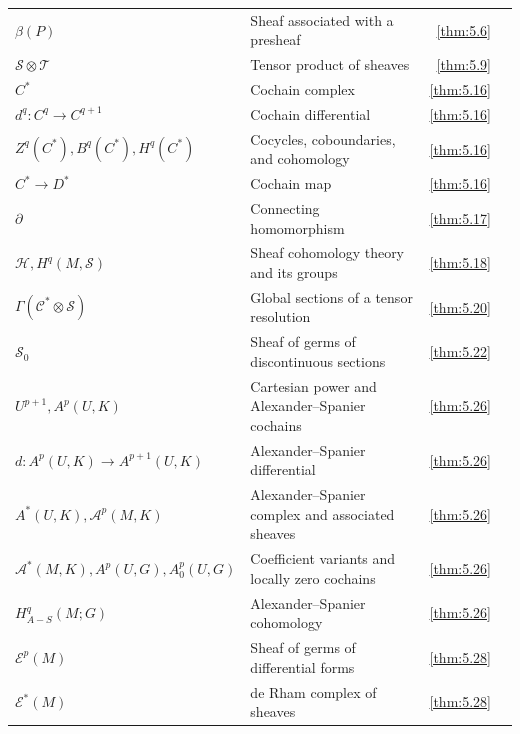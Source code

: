 {\begin{longtable}{@{}>{\raggedright\arraybackslash}p{.39\linewidth}>{\raggedright\arraybackslash}p{.39\linewidth}r r@{}}
$\beta(P)$ & Sheaf associated with a presheaf & \ref{thm:5.6} & \pageref{thm:5.6} \\
$\mathcal S\otimes\mathcal T$ & Tensor product of sheaves & \ref{thm:5.9} & \pageref{thm:5.9} \\
$C^{*}$ & Cochain complex & \ref{thm:5.16} & \pageref{thm:5.16} \\
$d^{q}\colon C^{q}\to C^{q+1}$ & Cochain differential & \ref{thm:5.16} & \pageref{thm:5.16} \\
$Z^{q}(C^{*}),\allowbreak B^{q}(C^{*}),\allowbreak H^{q}(C^{*})$ & Cocycles, coboundaries, and cohomology & \ref{thm:5.16} & \pageref{thm:5.16} \\
$C^{\ast}\to D^{\ast}$ & Cochain map & \ref{thm:5.16} & \pageref{thm:5.16} \\
$\partial$ & Connecting homomorphism & \ref{thm:5.17} & \pageref{thm:5.17} \\
$\mathcal{H},\allowbreak H^{q}(M,\allowbreak \mathcal{S})$ & Sheaf cohomology theory and its groups & \ref{thm:5.18} & \pageref{thm:5.18} \\
$\Gamma(\mathcal{C}^{\ast}\otimes\mathcal{S})$ & Global sections of a tensor resolution & \ref{thm:5.20} & \pageref{thm:5.20} \\
$\mathcal S_0$ & Sheaf of germs of discontinuous sections & \ref{thm:5.22} & \pageref{thm:5.22} \\
$U^{p+1},\allowbreak A^{p}(U,\allowbreak K)$ & Cartesian power and Alexander--Spanier cochains & \ref{thm:5.26} & \pageref{thm:5.26} \\
$d:A^{p}(U,\allowbreak K)\to A^{p+1}(U,\allowbreak K)$ & Alexander--Spanier differential & \ref{thm:5.26} & \pageref{thm:5.26} \\
$A^{*}(U,\allowbreak K),\allowbreak \mathcal{A}^{p}(M,\allowbreak K)$ & Alexander--Spanier complex and associated sheaves & \ref{thm:5.26} & \pageref{thm:5.26} \\
$\mathcal{A}^{*}(M,\allowbreak K),\allowbreak A^{p}(U,\allowbreak G),\allowbreak A_{0}^{p}(U,\allowbreak G)$ & Coefficient variants and locally zero cochains & \ref{thm:5.26} & \pageref{thm:5.26} \\
$H_{A-S}^{q}(M;G)$ & Alexander--Spanier cohomology & \ref{thm:5.26} & \pageref{thm:5.26} \\
$\mathcal{E}^{p}(M)$ & Sheaf of germs of differential forms & \ref{thm:5.28} & \pageref{thm:5.28} \\
$\mathcal{E}^{*}(M)$ & de Rham complex of sheaves & \ref{thm:5.28} & \pageref{thm:5.28} \\

\end{longtable}}
